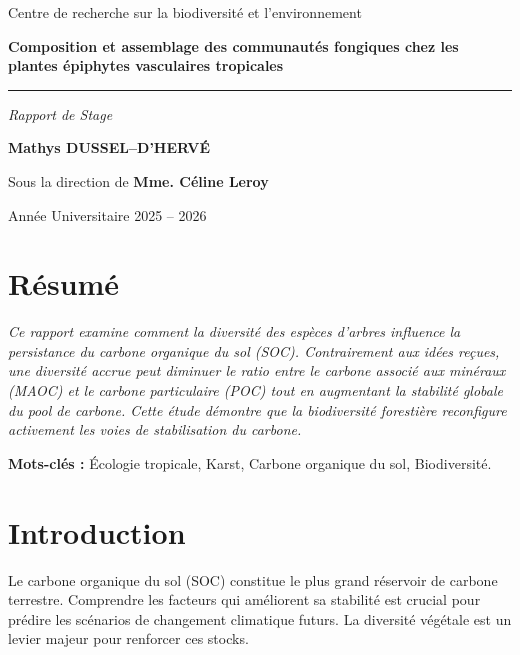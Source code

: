 \documentclass[11pt, a4paper]{article}
\newcommand{\monTitre}{Composition et assemblage des communautés fongiques chez les plantes épiphytes vasculaires tropicales}
\newcommand{\monNom}{Mathys DUSSEL--D'HERVÉ}
\newcommand{\monLabo}{Centre de recherche sur la biodiversité et l'environnement}
\begin{document}
\begin{titlepage}
    \centering
    \vspace*{2cm}
    {\large \monLabo \par}
    \vspace{4cm}
    {\Huge \bfseries \color{naturegreen} \monTitre \par}
    \vspace{1cm}
    \rule{0.5\textwidth}{1pt}
    \par
      \vspace{0.5cm}
      {\Large \textit{Rapport de Stage}}
    \vspace{2cm}
    
    {\Large \textbf{\monNom} \par}
    \vspace{1cm}
    {\large Sous la direction de \textbf{Mme. Céline Leroy}}
    
    \vfill
    
    {\large Année Universitaire 2025 -- 2026 \par}
\end{titlepage}

\newpage
\onehalfspacing %

\section*{Résumé}
\textit{
Ce rapport examine comment la diversité des espèces d'arbres influence la persistance du carbone organique du sol (SOC). Contrairement aux idées reçues, une diversité accrue peut diminuer le ratio entre le carbone associé aux minéraux (MAOC) et le carbone particulaire (POC) tout en augmentant la stabilité globale du pool de carbone. Cette étude démontre que la biodiversité forestière reconfigure activement les voies de stabilisation du carbone.
}

\vspace{2em}
\textbf{Mots-clés :} Écologie tropicale, Karst, Carbone organique du sol, Biodiversité.

\newpage
\tableofcontents
\newpage

\section{Introduction}
Le carbone organique du sol (SOC) constitue le plus grand réservoir de carbone terrestre. Comprendre les facteurs qui améliorent sa stabilité est crucial pour prédire les scénarios de changement climatique futurs. La diversité végétale est un levier majeur pour renforcer ces stocks.
\end{document}
